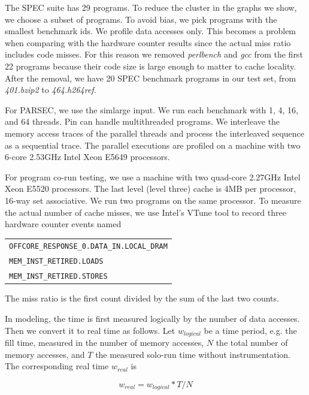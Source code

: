 The SPEC suite has 29 programs.  To reduce the cluster in the graphs
we show, we choose a subset of programs.  To avoid bias, we pick
programs with the smallest benchmark ids.  We profile data accesses
only.  This becomes a problem when comparing with the hardware counter
results since the actual miss ratio includes code misses.  For this
reason we removed \emph{perlbench} and \emph{gcc} from the first 22
programs because their code size is large enough to matter to cache
locality.  After the removal, we have 20 SPEC benchmark programs in
our test set, from \emph{401.bzip2} to \emph{464.h264ref}.

For PARSEC, we use the simlarge input.  We run each benchmark with 1, 4,
16, and 64 threads.  Pin can handle multithreaded programs.  We
interleave the memory access traces of the parallel threads and
process the interleaved sequence as a sequential trace.  The parallel
executions are profiled on a machine with two 6-core 2.53GHz Intel
Xeon E5649 processors.

For program co-run testing, we use a machine with two quad-core
2.27GHz Intel Xeon E5520 processors.  The last level (level three)
cache is 4MB per processor, 16-way set associative.  We run two
programs on the same processor.  To measure the actual number of cache
misses, we use Intel's VTune tool to record three hardware counter
events named 

\begin{tabular}{l}
\texttt{OFFCORE\_RESPONSE\_0.DATA\_IN.LOCAL\_DRAM} \\
\texttt{MEM\_INST\_RETIRED.LOADS} \\
\texttt{MEM\_INST\_RETIRED.STORES} \\
\end{tabular}

\noindent The miss ratio is the first count divided by the sum of the
last two counts. 

In modeling, the time is first measured logically by the number of
data accesses.  Then we convert it to real time as follows.  Let
$w_{logical}$ be a time period, e.g. the fill time, measured in the
number of memory accesses, $N$ the total number of memory accesses,
and $T$ the measured solo-run time without instrumentation.  The
corresponding real time $w_{real}$ is

\begin{equation*}
w_{real} = w_{logical} * T / N
\label{eq:time}
\end{equation*}

